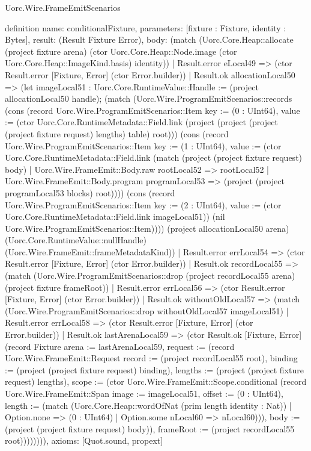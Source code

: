 \begin{lexlean}{Uorc.Wire.FrameEmitScenarios}
\begin{semanticmodule}
definition{
  name: conditionalFixture,
  parameters: [fixture : Fixture, identity : Bytes],
  result: (Result Fixture Error),
  body: (match (Uorc.Core.Heap::allocate (project fixture arena) (ctor Uorc.Core.Heap::Node.image (ctor Uorc.Core.Heap::ImageKind.basis) identity))
    | Result.error eLocal49 => (ctor Result.error [Fixture, Error] (ctor Error.builder))
    | Result.ok allocationLocal50 => (let imageLocal51 : Uorc.Core.RuntimeValue::Handle := (project allocationLocal50 handle); (match (Uorc.Wire.ProgramEmitScenarios::records (cons (record Uorc.Wire.ProgramEmitScenarios::Item {key := (0 : UInt64), value := (ctor Uorc.Core.RuntimeMetadata::Field.link (project (project (project (project fixture request) lengths) table) root))}) (cons (record Uorc.Wire.ProgramEmitScenarios::Item {key := (1 : UInt64), value := (ctor Uorc.Core.RuntimeMetadata::Field.link (match (project (project fixture request) body)
        | Uorc.Wire.FrameEmit::Body.raw rootLocal52 => rootLocal52
        | Uorc.Wire.FrameEmit::Body.program programLocal53 => (project (project programLocal53 blocks) root)))}) (cons (record Uorc.Wire.ProgramEmitScenarios::Item {key := (2 : UInt64), value := (ctor Uorc.Core.RuntimeMetadata::Field.link imageLocal51)}) (nil Uorc.Wire.ProgramEmitScenarios::Item)))) (project allocationLocal50 arena) (Uorc.Core.RuntimeValue::nullHandle) (Uorc.Wire.FrameEmit::frameMetadataKind))
      | Result.error errLocal54 => (ctor Result.error [Fixture, Error] (ctor Error.builder))
      | Result.ok recordLocal55 => (match (Uorc.Wire.ProgramEmitScenarios::drop (project recordLocal55 arena) (project fixture frameRoot))
        | Result.error errLocal56 => (ctor Result.error [Fixture, Error] (ctor Error.builder))
        | Result.ok withoutOldLocal57 => (match (Uorc.Wire.ProgramEmitScenarios::drop withoutOldLocal57 imageLocal51)
          | Result.error errLocal58 => (ctor Result.error [Fixture, Error] (ctor Error.builder))
          | Result.ok lastArenaLocal59 => (ctor Result.ok [Fixture, Error] (record Fixture {arena := lastArenaLocal59, request := (record Uorc.Wire.FrameEmit::Request {record := (project recordLocal55 root), binding := (project (project fixture request) binding), lengths := (project (project fixture request) lengths), scope := (ctor Uorc.Wire.FrameEmit::Scope.conditional (record Uorc.Wire.FrameEmit::Span {image := imageLocal51, offset := (0 : UInt64), length := (match (Uorc.Core.Heap::wordOfNat (prim length identity : Nat))
            | Option.none => (0 : UInt64)
            | Option.some nLocal60 => nLocal60)})), body := (project (project fixture request) body)}), frameRoot := (project recordLocal55 root)}))))))),
  axioms: [Quot.sound, propext]
}


\end{semanticmodule}
\end{lexlean}
